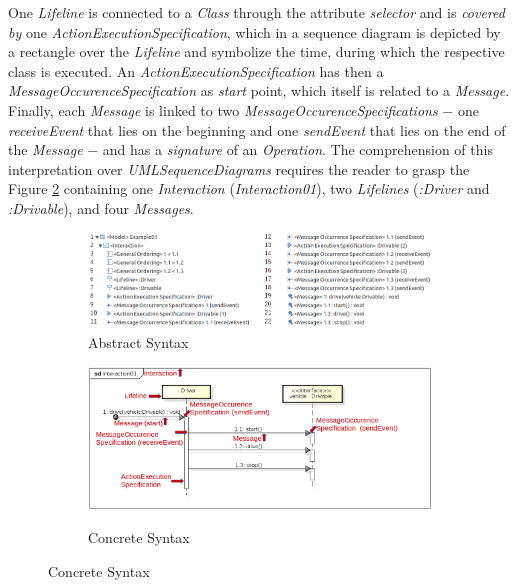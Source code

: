\documentclass[tuberlin,cic,tc,english,noabntcite]{iiufrgs}
\begin{document}
One \emph{Lifeline} is connected to a \emph{Class} through the attribute \emph{selector} and is \emph{covered by} one \emph{ActionExecutionSpecification}, which in a sequence diagram is depicted by a rectangle over the \emph{Lifeline} and symbolize the time, during which the respective class is executed. An \emph{ActionExecutionSpecification} has then a \emph{MessageOccurenceSpecification} as \emph{start} point, which itself is related to a \emph{Message}. Finally, each \emph{Message} is linked to two \emph{MessageOccurenceSpecifications} $-$ one \emph{receiveEvent} that lies on the beginning and one \emph{sendEvent} that lies on the end of the \emph{Message} $-$ and has a \emph{signature} of an \emph{Operation}. The comprehension of this interpretation over \emph{UMLSequenceDiagrams} requires the reader to grasp the Figure \ref{fig:uml_metamodel_sequence_example} containing one \emph{Interaction} (\emph{Interaction01}), two \emph{Lifelines} (\emph{:Driver} and \emph{:Drivable}), and four \emph{Messages}.

\begin{figure}[H]
    \caption{An example of a model \emph{UMLSequenceDiagram} visualized in two different ways}
    \centering
   	\begin{subfigure}[h]{\textwidth}
   		\caption{Abstract Syntax}
   		\includegraphics[width=\textwidth]{umlSequenceDiagramExample01}
   	\end{subfigure}
   	\begin{subfigure}[h]{\textwidth}
   		\caption{Concrete Syntax}
   		\includegraphics[width=\textwidth]{umlSequenceDiagramExample01_Diagram}
   		\label{fig:uml_metamodel_sequence_example_diagram}
   	\end{subfigure}
    \label{fig:uml_metamodel_sequence_example}
\end{figure}
\end{document}
